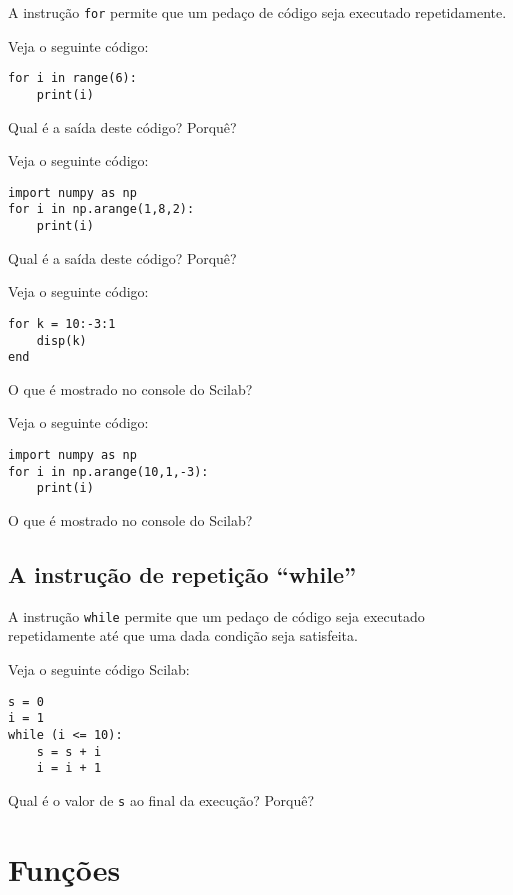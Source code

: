 A instrução \verb+for+ permite que um pedaço de código seja executado repetidamente.

\begin{ex}
  Veja o seguinte código:
\begin{verbatim}
for i in range(6):
    print(i)
\end{verbatim}
Qual é a saída deste código? Porquê?
\end{ex}

\begin{ex}
  Veja o seguinte código:
\begin{verbatim}
import numpy as np
for i in np.arange(1,8,2):
    print(i)
\end{verbatim}
Qual é a saída deste código? Porquê?
\end{ex}

\begin{ex}
  Veja o seguinte código:
\begin{verbatim}
for k = 10:-3:1
    disp(k)
end
\end{verbatim}
O que é mostrado no console do Scilab?
\end{ex}

\begin{ex}
  Veja o seguinte código:
\begin{verbatim}
import numpy as np
for i in np.arange(10,1,-3):
    print(i)
\end{verbatim}
O que é mostrado no console do Scilab?
\end{ex}

\subsection{A instrução de repetição ``while''}

A instrução \verb+while+ permite que um pedaço de código seja executado repetidamente até que uma dada condição seja satisfeita.

\begin{ex}
Veja o seguinte código Scilab:
\begin{verbatim}
s = 0
i = 1
while (i <= 10):
    s = s + i
    i = i + 1
\end{verbatim}
Qual é o valor de \verb+s+ ao final da execução? Porquê?
\end{ex}

\section{Funções}

